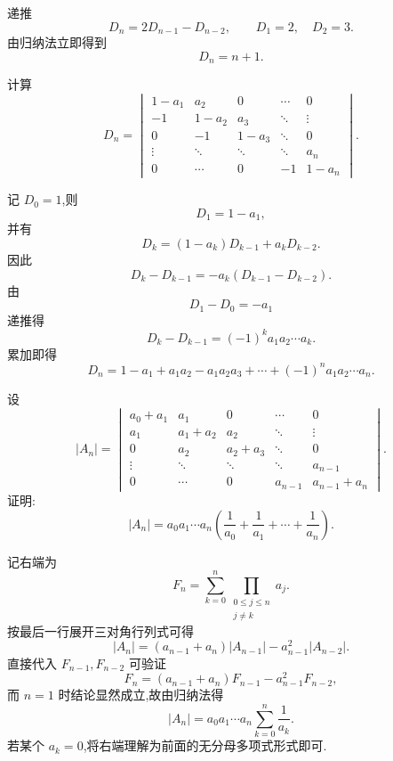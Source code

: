 \begin{solution}
递推
\[
D_n=2D_{n-1}-D_{n-2},
\qquad
D_1=2,\quad D_2=3.
\]
由归纳法立即得到
\[
\boxed{D_n=n+1}.
\]
\end{solution}


\begin{example}
计算
\[
D_n=
\begin{vmatrix}
1-a_1 & a_2 & 0 & \cdots & 0\\
-1 & 1-a_2 & a_3 & \ddots & \vdots\\
0 & -1 & 1-a_3 & \ddots & 0\\
\vdots & \ddots & \ddots & \ddots & a_n\\
0 & \cdots & 0 & -1 & 1-a_n
\end{vmatrix}.
\]
\end{example}
\exampleblank

\begin{solution}
记 $D_0=1$,则
\[
D_1=1-a_1,
\]
并有
\[
D_k=(1-a_k)D_{k-1}+a_kD_{k-2}.
\]
因此
\[
D_k-D_{k-1}
=
-a_k(D_{k-1}-D_{k-2}).
\]
由
\[
D_1-D_0=-a_1
\]
递推得
\[
D_k-D_{k-1}
=
(-1)^k a_1a_2\cdots a_k.
\]
累加即得
\[
\boxed{
D_n
=
1-a_1+a_1a_2-a_1a_2a_3+\cdots
+(-1)^n a_1a_2\cdots a_n
}.
\]
\end{solution}


\begin{example}
设
\[
|A_n|=
\begin{vmatrix}
a_0+a_1 & a_1 & 0 & \cdots & 0\\
a_1 & a_1+a_2 & a_2 & \ddots & \vdots\\
0 & a_2 & a_2+a_3 & \ddots & 0\\
\vdots & \ddots & \ddots & \ddots & a_{n-1}\\
0 & \cdots & 0 & a_{n-1} & a_{n-1}+a_n
\end{vmatrix}.
\]
证明:
\[
|A_n|
=
a_0a_1\cdots a_n
\left(
\dfrac{1}{a_0}
+\dfrac{1}{a_1}
+\cdots
+\dfrac{1}{a_n}
\right).
\]
\end{example}
\exampleblank

\begin{solution}
记右端为
\[
F_n=\sum\limits_{k=0}^{n}\prod_{\substack{0\leq j\leq n\\j\neq k}}a_j.
\]
按最后一行展开三对角行列式可得
\[
|A_n|
=
(a_{n-1}+a_n)|A_{n-1}|
-a_{n-1}^2|A_{n-2}|.
\]
直接代入 $F_{n-1},F_{n-2}$ 可验证
\[
F_n
=
(a_{n-1}+a_n)F_{n-1}
-a_{n-1}^2F_{n-2},
\]
而 $n=1$ 时结论显然成立,故由归纳法得
\[
\boxed{
|A_n|
=
a_0a_1\cdots a_n
\sum\limits_{k=0}^{n}\dfrac{1}{a_k}
}.
\]
若某个 $a_k=0$,将右端理解为前面的无分母多项式形式即可.
\end{solution}


